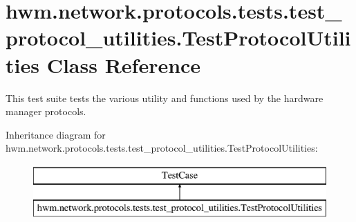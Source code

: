 \hypertarget{classhwm_1_1network_1_1protocols_1_1tests_1_1test__protocol__utilities_1_1_test_protocol_utilities}{\section{hwm.\-network.\-protocols.\-tests.\-test\-\_\-protocol\-\_\-utilities.\-Test\-Protocol\-Utilities Class Reference}
\label{classhwm_1_1network_1_1protocols_1_1tests_1_1test__protocol__utilities_1_1_test_protocol_utilities}
}


This test suite tests the various utility and functions used by the hardware manager protocols.  


Inheritance diagram for hwm.\-network.\-protocols.\-tests.\-test\-\_\-protocol\-\_\-utilities.\-Test\-Protocol\-Utilities\-:\begin{figure}[H]
\begin{center}
\leavevmode
\includegraphics[height=2.000000cm]{classhwm_1_1network_1_1protocols_1_1tests_1_1test__protocol__utilities_1_1_test_protocol_utilities}
\end{center}
\end{figure}
